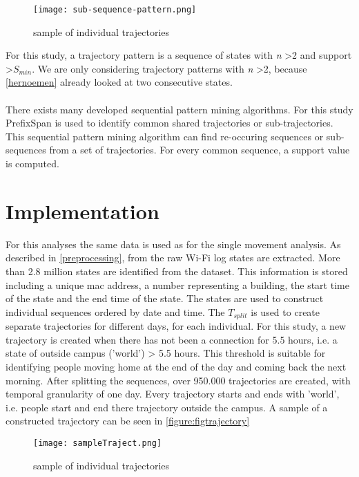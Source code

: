 \begin{figure}[H]
\centering
\texttt{[image: sub-sequence-pattern.png]}
\captionsetup{justification=centering}
\caption{sample of individual trajectories}
\label{figure:figseqpattern}
\end{figure}

For this study, a trajectory pattern is a sequence of states with \textit{n} \textgreater 2 and support \textgreater \textit{$S_{min}$}. We are only considering trajectory patterns with \textit{n} \textgreater 2, because \autoref{hernoemen} already looked at two consecutive states.\\\\
There exists many developed sequential pattern mining algorithms. For this study PrefixSpan \cite{pei2004mining} is used to identify common shared trajectories or sub-trajectories. This sequential pattern mining algorithm can find re-occuring sequences or sub-sequences from a set of trajectories. For every common sequence, a support value is computed. 
\section{Implementation}
For this analyses the same data is used as for the single movement analysis. As described in \autoref{preprocessing}, from the raw Wi-Fi log states are extracted. More than 2.8 million states are identified from the dataset. This information is stored including a unique mac address, a number representing a building, the start time of the state and the end time of the state. The states are used to construct individual sequences ordered by date and time. The \textit{$T_{split}$} is used to create separate trajectories for different days, for each individual. For this study, a new trajectory is created when there has not been a connection for 5.5 hours, i.e. a state of outside campus ('world') > 5.5 hours. This threshold is suitable for identifying people moving home at the end of the day and coming back the next morning. After splitting the sequences, over 950.000 trajectories are created, with temporal granularity of one day. Every trajectory starts and ends with 'world', i.e. people start and end there trajectory outside the campus. A sample of a constructed trajectory can be seen in \autoref{figure:figtrajectory}

\begin{figure}[H]
\centering
\texttt{[image: sampleTraject.png]}
\captionsetup{justification=centering}
\caption{sample of individual trajectories}
\label{figure:figtrajectory}
\end{figure}

